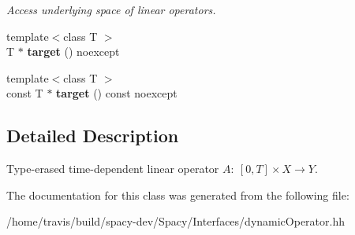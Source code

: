 \begin{DoxyCompactItemize}
\begin{DoxyCompactList}\small\item\em Access underlying space of linear operators. \end{DoxyCompactList}\item 
\hypertarget{classSpacy_1_1DynamicLinearOperator_a5574c61e31ef28d9d1660dd69fc31810}{{\footnotesize template$<$class T $>$ }\\T $\ast$ {\bfseries target} () noexcept}\label{classSpacy_1_1DynamicLinearOperator_a5574c61e31ef28d9d1660dd69fc31810}

\item 
\hypertarget{classSpacy_1_1DynamicLinearOperator_a1bb194c6f220a136916f661314f543ae}{{\footnotesize template$<$class T $>$ }\\const T $\ast$ {\bfseries target} () const noexcept}\label{classSpacy_1_1DynamicLinearOperator_a1bb194c6f220a136916f661314f543ae}

\end{DoxyCompactItemize}


\subsection{Detailed Description}
Type-\/erased time-\/dependent linear operator $A:\ [0,T] \times X \to Y $. 

The documentation for this class was generated from the following file\-:\begin{DoxyCompactItemize}
\item 
/home/travis/build/spacy-\/dev/\-Spacy/\-Interfaces/dynamic\-Operator.\-hh\end{DoxyCompactItemize}
